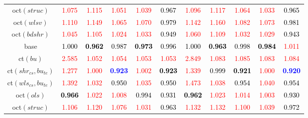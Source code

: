 \begin{tabular}[t]{c|>{}cccc>{}c|ccccc}
oct$(struc)$ & \textcolor{red}{1.075} & \textcolor{red}{1.115} & \textcolor{red}{1.051} & \textcolor{red}{1.039} & \textcolor{black}{0.967} & \textcolor{red}{1.096} & \textcolor{red}{1.117} & \textcolor{red}{1.064} & \textcolor{red}{1.033} & \textcolor{black}{0.965}\\
oct$(wlsv)$ & \textcolor{red}{1.110} & \textcolor{red}{1.149} & \textcolor{red}{1.065} & \textcolor{red}{1.070} & \textcolor{black}{0.979} & \textcolor{red}{1.142} & \textcolor{red}{1.160} & \textcolor{red}{1.082} & \textcolor{red}{1.073} & \textcolor{black}{0.981}\\
oct$(bdshr)$ & \textcolor{red}{1.045} & \textcolor{red}{1.105} & \textcolor{red}{1.024} & \textcolor{red}{1.033} & \textcolor{black}{0.949} & \textcolor{red}{1.060} & \textcolor{red}{1.109} & \textcolor{red}{1.032} & \textcolor{red}{1.029} & \textcolor{black}{0.943}\\
base & \textcolor{black}{1.000} & \textcolor{black}{\textbf{0.962}} & \textcolor{black}{0.987} & \textcolor{black}{\textbf{0.973}} & \textcolor{black}{0.996} & \textcolor{black}{1.000} & \textcolor{black}{\textbf{0.963}} & \textcolor{black}{0.998} & \textcolor{black}{\textbf{0.984}} & \textcolor{red}{1.011}\\
ct$(bu)$ & \textcolor{red}{2.585} & \textcolor{red}{1.052} & \textcolor{red}{1.054} & \textcolor{red}{1.053} & \textcolor{red}{1.053} & \textcolor{red}{2.849} & \textcolor{red}{1.083} & \textcolor{red}{1.085} & \textcolor{red}{1.083} & \textcolor{red}{1.084}\\
ct$(shr_{cs}, bu_{te})$ & \textcolor{red}{1.277} & \textcolor{red}{1.000} & \textcolor{blue}{\textbf{0.923}} & \textcolor{red}{1.002} & \textcolor{black}{\textbf{0.923}} & \textcolor{red}{1.339} & \textcolor{black}{0.999} & \textcolor{black}{\textbf{0.921}} & \textcolor{red}{1.000} & \textcolor{blue}{\textbf{0.920}}\\
ct$(wls_{cs}, bu_{te})$ & \textcolor{red}{1.392} & \textcolor{red}{1.032} & \textcolor{black}{0.950} & \textcolor{red}{1.035} & \textcolor{black}{0.950} & \textcolor{red}{1.473} & \textcolor{red}{1.038} & \textcolor{black}{0.954} & \textcolor{red}{1.040} & \textcolor{black}{0.954}\\
oct$(ols)$ & \textcolor{black}{\textbf{0.966}} & \textcolor{red}{1.022} & \textcolor{red}{1.008} & \textcolor{black}{0.994} & \textcolor{black}{0.931} & \textcolor{black}{\textbf{0.962}} & \textcolor{red}{1.023} & \textcolor{red}{1.014} & \textcolor{red}{1.003} & \textcolor{black}{0.930}\\
oct$(struc)$ & \textcolor{red}{1.106} & \textcolor{red}{1.120} & \textcolor{red}{1.076} & \textcolor{red}{1.031} & \textcolor{black}{0.963} & \textcolor{red}{1.132} & \textcolor{red}{1.132} & \textcolor{red}{1.100} & \textcolor{red}{1.039} & \textcolor{black}{0.972}\\

\end{tabular}
